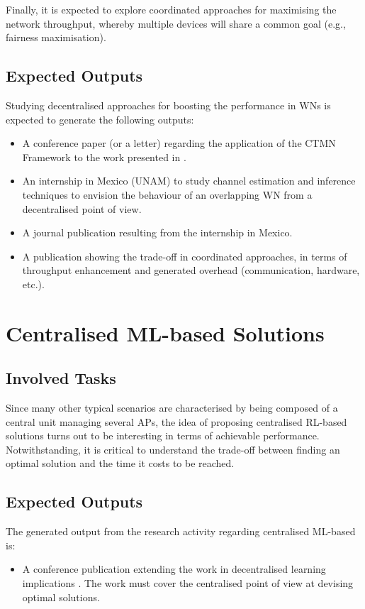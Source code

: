 \documentclass[12pt, a4paper,twoside]{tesi_upf}
\begin{document}
					Finally, it is expected to explore coordinated approaches for maximising the network throughput, whereby multiple devices will share a common goal (e.g., fairness maximisation). 
			\subsection{Expected Outputs}		
				Studying decentralised approaches for boosting the performance in WNs is expected to generate the following outputs:	
				\begin{itemize}
					\item A conference paper (or a letter) regarding the application of the CTMN Framework to the work presented in \cite{wilhelmi2017implications}. 
					\item An internship in Mexico (UNAM) to study channel estimation and inference techniques to envision the behaviour of an overlapping WN from a decentralised point of view.
					\item A journal publication resulting from the internship in Mexico.
					\item A publication showing the trade-off in coordinated approaches, in terms of throughput enhancement and generated overhead (communication, hardware, etc.).
				\end{itemize}
				
		\section{Centralised ML-based Solutions}
		\label{section:contribution4}		
			\subsection{Involved Tasks}		
				Since many other typical scenarios are characterised by being composed of a central unit managing several APs, the idea of proposing centralised RL-based solutions turns out to be interesting in terms of achievable performance. Notwithstanding, it is critical to understand the trade-off between finding an optimal solution and the time it costs to be reached.
			\subsection{Expected Outputs}
				The generated output from the research activity regarding centralised ML-based is:
				\begin{itemize}
					\item A conference publication extending the work in decentralised learning implications \cite{wilhelmi2017implications, wilhelmi2017enhancing}. The work must cover the centralised point of view at devising optimal solutions.				
				\end{itemize}
		
\end{document}
